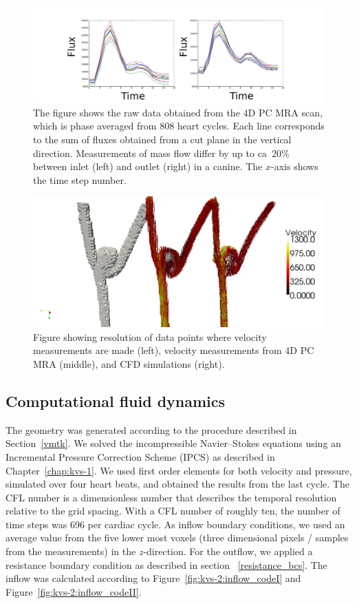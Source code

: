 \begin{figure}
  \center\includegraphics[width=\largefig]{chapters/kvs-2/pdf/mass_dog.pdf}
  \caption{The figure shows the raw data obtained from the 4D PC MRA scan,
which is phase averaged from 808 heart cycles. Each line corresponds to
the sum of fluxes obtained from a cut plane in the vertical direction.
Measurements of mass flow differ by up to ca~20\% between
inlet (left) and outlet (right) in a canine. The $x$-axis shows
the time step number.}
  \label{fig:kvs-2:mass_dog}
\end{figure}

\begin{figure}
  \center\includegraphics[width=\largefig]{chapters/kvs-2/pdf/dog_data_mr_cfd.pdf}
  \caption{Figure showing resolution of data points where velocity
    measurements are made (left), velocity measurements from 4D PC MRA
    (middle), and CFD simulations (right).}
  \label{fig:kvs-2:dog_mri}
\end{figure}

\subsection{Computational fluid dynamics}

The geometry was generated according to the procedure described in
Section~\ref{vmtk}. We solved the incompressible Navier--Stokes
equations using an Incremental Pressure Correction Scheme (IPCS) as
described in Chapter~\ref{chap:kvs-1}. We used first order elements
for both velocity and pressure, simulated over four heart beats, and
obtained the results from the last cycle. The CFL number is a
dimensionless number that describes the temporal resolution relative
to the grid spacing.  With a CFL number of roughly ten, the number of
time steps was 696 per cardiac cycle. As inflow boundary conditions,
we used an average value from the five lower most voxels (three
dimensional pixels / samples from the measurements) in the
$z$-direction. For the outflow, we applied a resistance boundary
condition as described in section ~\ref{resistance_bcs}. The inflow
was calculated according to Figure~\ref{fig:kvs-2:inflow_codeI} and
Figure~\ref{fig:kvs-2:inflow_codeII}.

